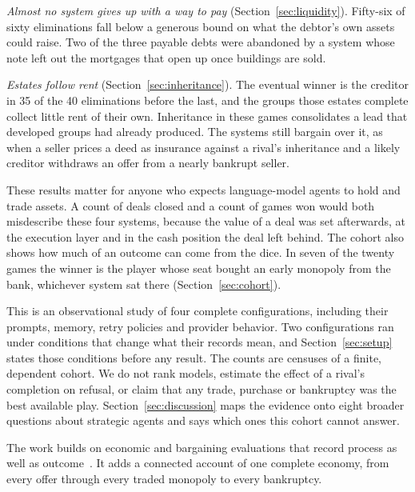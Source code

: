 \emph{Almost no system gives up with a way to pay} (Section~\ref{sec:liquidity}). Fifty-six of sixty eliminations fall below a generous bound on what the debtor's own assets could raise. Two of the three payable debts were abandoned by a system whose note left out the mortgages that open up once buildings are sold.

\emph{Estates follow rent} (Section~\ref{sec:inheritance}). The eventual winner is the creditor in 35 of the 40 eliminations before the last, and the groups those estates complete collect little rent of their own. Inheritance in these games consolidates a lead that developed groups had already produced. The systems still bargain over it, as when a seller prices a deed as insurance against a rival's inheritance and a likely creditor withdraws an offer from a nearly bankrupt seller.

These results matter for anyone who expects language-model agents to hold and trade assets. A count of deals closed and a count of games won would both misdescribe these four systems, because the value of a deal was set afterwards, at the execution layer and in the cash position the deal left behind. The cohort also shows how much of an outcome can come from the dice. In seven of the twenty games the winner is the player whose seat bought an early monopoly from the bank, whichever system sat there (Section~\ref{sec:cohort}).

This is an observational study of four complete configurations, including their prompts, memory, retry policies and provider behavior. Two configurations ran under conditions that change what their records mean, and Section~\ref{sec:setup} states those conditions before any result. The counts are censuses of a finite, dependent cohort. We do not rank models, estimate the effect of a rival's completion on refusal, or claim that any trade, purchase or bankruptcy was the best available play. Section~\ref{sec:discussion} maps the evidence onto eight broader questions about strategic agents and says which ones this cohort cannot answer.

The work builds on economic and bargaining evaluations that record process as well as outcome~\cite{backlund2025vendingbench,li2026arena,wu2026agentmonopoly,hu2026finboardbench,bianchi2024negotiationarena}. It adds a connected account of one complete economy, from every offer through every traded monopoly to every bankruptcy.


